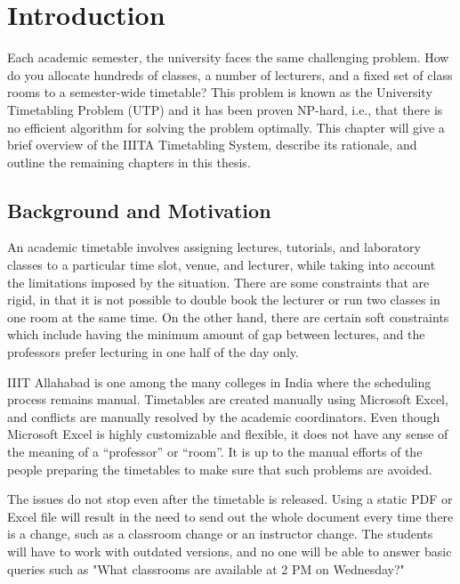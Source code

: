 
\chapter{Introduction} %

\label{Chapter1} %


Each academic semester, the university faces the same challenging problem. How do you allocate hundreds of classes, a number of lecturers, and a fixed set of class rooms to a semester-wide timetable? This problem is known as the University Timetabling Problem (UTP) and it has been proven NP-hard, i.e., that there is no efficient algorithm for solving the problem optimally. This chapter will give a brief overview of the IIITA Timetabling System, describe its rationale, and outline the remaining chapters in this thesis.
\section{Background and Motivation}

An academic timetable involves assigning lectures, tutorials, and laboratory classes to a particular time slot, venue, and lecturer, while taking into account the limitations imposed by the situation. There are some constraints that are rigid, in that it is not possible to double book the lecturer or run two classes in one room at the same time. On the other hand, there are certain soft constraints which include having the minimum amount of gap between lectures, and the professors prefer lecturing in one half of the day only.

IIIT Allahabad is one among the many colleges in India where the scheduling process remains manual. Timetables are created manually using Microsoft Excel, and conflicts are manually resolved by the academic coordinators. Even though Microsoft Excel is highly customizable and flexible, it does not have any sense of the meaning of a ``professor'' or ``room''. It is up to the manual efforts of the people preparing the timetables to make sure that such problems are avoided.

The issues do not stop even after the timetable is released. Using a static PDF or Excel file will result in the need to send out the whole document every time there is a change, such as a classroom change or an instructor change. The students will have to work with outdated versions, and no one will be able to answer basic queries such as "What classrooms are available at 2 PM on Wednesday?"

